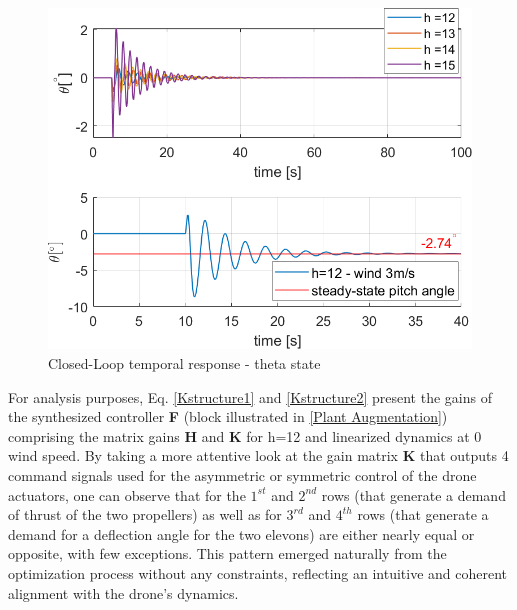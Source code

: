 \begin{figure}[hbt]
    \centering
    \includegraphics[width=0.9\columnwidth]{figures/windThetafinalhopeCrop.png}
    \vspace{-0.3cm}\caption{Closed-Loop temporal response - theta state}
    \label{thetanowind}
\end{figure}





For analysis purposes, Eq. \ref{Kstructure1} and \ref{Kstructure2} present the gains of the synthesized controller \textbf{F} (block illustrated in \ref{Plant Augmentation}) comprising the matrix gains \textbf{H} and \textbf{K} for h=12 and linearized dynamics at 0 wind speed. By taking a more attentive look at the gain matrix \textbf{K} that outputs 4 command signals used for the asymmetric or symmetric control of the drone actuators, one can observe that for the $1^{st}$ and $2^{nd}$ rows (that generate a demand of thrust of the two propellers) as well as for $3^{rd}$ and $4^{th}$ rows (that generate a demand for a deflection angle for the two elevons) are either nearly equal or opposite, with few exceptions. This pattern emerged naturally from the optimization process without any constraints, reflecting an intuitive and coherent alignment with the drone's dynamics.

